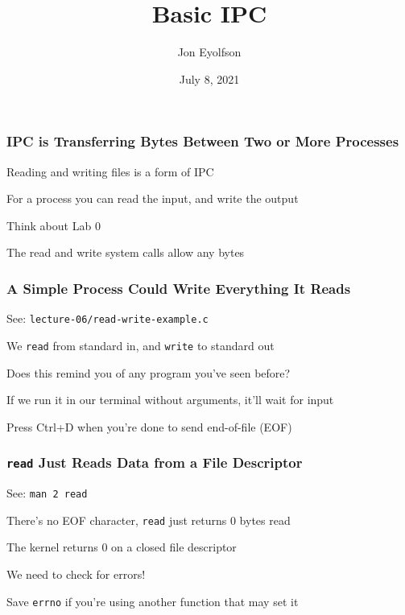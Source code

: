

\title{Basic IPC}
\author{Jon Eyolfson}
\date{July 8, 2021}


  \begin{frame}
    \titlepage
  \end{frame}

  \begin{frame}
    \frametitle{IPC is Transferring Bytes Between Two or More Processes}

    Reading and writing files is a form of IPC

    \vspace{2em}

    For a process you can read the input, and write the output

    \hspace{2em} Think about Lab 0

    \vspace{2em}

    The read and write system calls allow any bytes
  \end{frame}

  \begin{frame}
    \frametitle{A Simple Process Could Write Everything It Reads}

    See: \texttt{lecture-06/read-write-example.c}

    \vspace{2em}

    We \texttt{read} from standard in, and \texttt{write} to standard out

    \hspace{2em} Does this remind you of any program you've seen before?

    \vspace{2em}

    If we run it in our terminal without arguments, it'll wait for input

    \hspace{2em} Press Ctrl+D when you're done to send end-of-file (EOF)
  \end{frame}

  \begin{frame}
    \frametitle{\texttt{read} Just Reads Data from a File Descriptor}

    See: \texttt{man 2 read}

    \vspace{2em}

    There's no EOF character, \texttt{read} just returns 0 bytes read

    \hspace{2em} The kernel returns 0 on a closed file descriptor

    \vspace{2em}

    We need to check for errors!

    \hspace{2em} Save \texttt{errno} if you're using another function that may
                 set it
  \end{frame}

